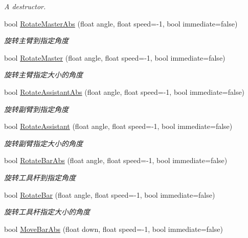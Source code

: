 \begin{DoxyCompactItemize}
\begin{DoxyCompactList}\small\item\em A destructor. \end{DoxyCompactList}\item 
bool \hyperlink{class_control_ad223c63a5825a584f17a4cfc3b1b021d}{Rotate\+Master\+Abs} (float angle, float speed=-\/1, bool immediate=false)
\begin{DoxyCompactList}\small\item\em 旋转主臂到指定角度 \end{DoxyCompactList}\item 
bool \hyperlink{class_control_ada672bd88cf68c704896094e831c6712}{Rotate\+Master} (float angle, float speed=-\/1, bool immediate=false)
\begin{DoxyCompactList}\small\item\em 旋转主臂指定大小的角度 \end{DoxyCompactList}\item 
bool \hyperlink{class_control_a8639f928bd61943fc7f7a1f57b9aa544}{Rotate\+Assistant\+Abs} (float angle, float speed=-\/1, bool immediate=false)
\begin{DoxyCompactList}\small\item\em 旋转副臂到指定角度 \end{DoxyCompactList}\item 
bool \hyperlink{class_control_a1472aabfe513d8abd7e55fa665ca5ed4}{Rotate\+Assistant} (float angle, float speed=-\/1, bool immediate=false)
\begin{DoxyCompactList}\small\item\em 旋转副臂指定大小的角度 \end{DoxyCompactList}\item 
bool \hyperlink{class_control_a7a42b29c54f6bbcde494a57489fe9f70}{Rotate\+Bar\+Abs} (float angle, float speed=-\/1, bool immediate=false)
\begin{DoxyCompactList}\small\item\em 旋转工具杆到指定角度 \end{DoxyCompactList}\item 
bool \hyperlink{class_control_ae7a6809f813de5bf1ad1eaf682d572df}{Rotate\+Bar} (float angle, float speed=-\/1, bool immediate=false)
\begin{DoxyCompactList}\small\item\em 旋转工具杆指定大小的角度 \end{DoxyCompactList}\item 
bool \hyperlink{class_control_a1e089b19f49a8214e5791fa2fbd87cce}{Move\+Bar\+Abs} (float down, float speed=-\/1, bool immediate=false)

\end{DoxyCompactItemize}
